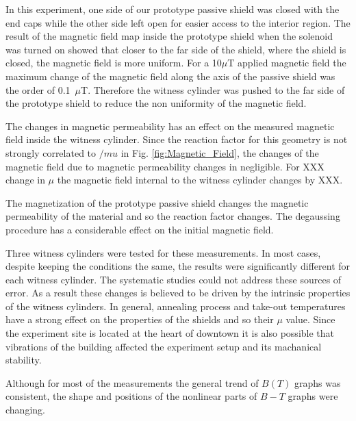 \documentclass[review]{elsarticle}
\begin{document}
In this experiment, one side of our prototype passive shield was closed with the end caps while the other side left open for easier access to the interior region. The result of the magnetic field map inside the prototype shield when the solenoid was  turned on showed that closer to the far side of the shield, where the shield is closed, the magnetic field is more uniform. For a 10$\mu$T applied magnetic field the maximum change of the magnetic field along the axis of the passive shield was the order of 0.1~$\mu$T.
Therefore the witness cylinder was pushed to the far side of the prototype shield to reduce the non uniformity of the magnetic field.

The changes in magnetic permeability has an effect on the measured magnetic field inside the witness cylinder. Since the reaction factor for this geometry is not strongly correlated to $/mu$ in Fig. \ref{fig:Magnetic_Field}, the changes of the magnetic field due to magnetic permeability changes in negligible. For XXX change in $\mu$ the magnetic field internal to the witness cylinder changes by XXX. 

The magnetization of the prototype passive shield changes the magnetic permeability of the material and so the reaction factor changes. The degaussing procedure has a considerable effect on the initial magnetic field.

Three witness cylinders were tested for these measurements. In most cases, despite keeping the conditions the same, the results were significantly different for each witness cylinder. The systematic studies could not address these sources of error. As a result these changes is believed to be driven by the intrinsic properties of the witness cylinders.   
In general, annealing process and take-out temperatures have a strong effect on the properties of the shields and so their $\mu$ value.
Since the experiment site is located at the heart of downtown it is also possible that vibrations of the building affected the experiment setup and its machanical stability.

Although for most of the measurements the general trend of $B(T)$ graphs was consistent, the shape and positions of the nonlinear parts of $B-T$ graphs were changing.



\end{document}
